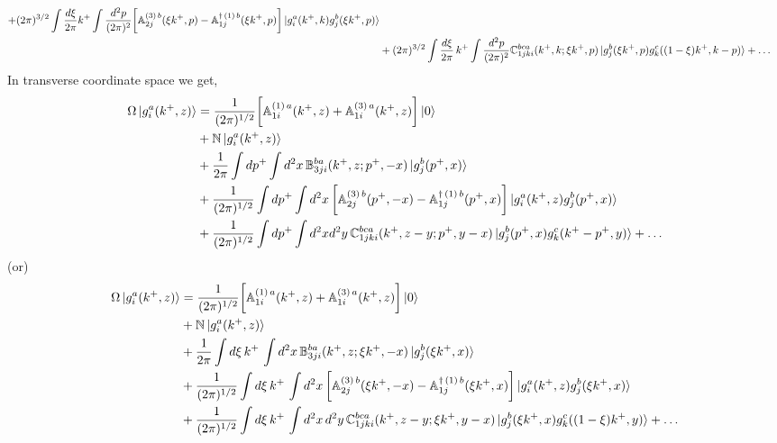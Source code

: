 \documentclass[aps,prd,amsmath,amssymb,nofootinbib]{revtex4-2}
\def\mf#1{\mathbb{#1}}
\numberwithin{equation}{section}
\begin{document}
\begin{itemize}
\begin{align}
    + (2\pi)^{3/2}\int \frac{d\xi}{2\pi} k^{+}\int \frac{d^2p}{(2\pi)^2}  \bigg[\mf{A}^{(3)\, b}_{2j}(\xi k^{+}, p) - \mf{A}^{\dagger\, (1)\, b}_{1j}(\xi k^{+},p)\bigg]  \ket{g^{a}_{i}(k^{+},k)g^{b}_{j}(\xi k^{+},p)} \notag \\ & 
    + (2\pi)^{3/2}\int \frac{d\xi}{2\pi}\, k^{+} \int \frac{d^{2}p}{(2\pi)^{2}}\mf{C}^{bca}_{1jki}(k^{+}, k; \xi k^{+}, p)\ket{g^{b}_{j}(\xi k^{+}, p)g^{c}_{k}((1-\xi)k^{+}, k-p)} %
    + \ldots 
\end{align}
In transverse coordinate space we get,
\begin{align}\label{Omegaongpos}
    \Omega\ket{g^{a}_{i}(k^{+},z)} & = \frac{1}{(2\pi)^{1/2}} \bigg[\mf{A}^{(1)\, a}_{1i}(k^{+},z)+\mf{A}^{(3)\, a}_{1i}(k^{+},z)\bigg]\ket{0} \notag \\ & 
   + 
   \mf{N}\ket{g^{a}_{i}(k^{+},z )} \notag \\ & 
    + \frac{1}{2\pi}\int  dp^{+}  \int d^2x \,\mf{B}^{ba}_{3ji}(k^+, z;p^+, -x)\ket{g^{b}_{j}(p^+, x)} \notag \\ & 
   + \frac{1}{(2\pi)^{1/2}}\int dp^{+}  \int d^{2}x\,\bigg[\mf{A}^{(3)\, b}_{2j}(p^{+},-x) - \mf{A}^{\dagger\, (1)\, b}_{1j}(p^{+},x)\bigg]  \ket{g^{a}_{i}(k^{+}, z)g^{b}_{j}(p^{+}, x)} \notag \\ & 
    + \frac{1}{(2\pi)^{1/2}}\int dp^{+} \int d^{2}x d^{2}y\, \mf{C}^{bca}_{1jki}(k^{+}, z-y; p^{+}, y-x) \ket{g^{b}_{j}(p^{+}, x)g^{c}_{k}(k^{+}-p^{+}, y)}  + \ldots 
\end{align}
(or)
\begin{align}\label{Omegaongposzeta}
    \Omega\ket{g^{a}_{i}(k^{+},z)} & = 
    \frac{1}{(2\pi)^{1/2}} \bigg[\mf{A}^{(1)\, a}_{1i}(k^{+},z)+\mf{A}^{(3)\, a}_{1i}(k^{+},z)\bigg]\ket{0} \notag \\ & + 
    \mf{N}\ket{g^{a}_{i}(k^{+},z )} \notag \\ & 
    + \frac{1}{2\pi}\int  d\xi \, k^{+}\, \int d^2x \,\mf{B}^{ba}_{3ji}(k^+, z;\xi k^+, -x)\ket{g^{b}_{j}(\xi k^+, x)} \notag \\ & 
    + \frac{1}{(2\pi)^{1/2}}\int d\xi\, k^{+}\, \int d^{2}x\, \bigg[\mf{A}^{(3)\, b}_{2j}(\xi k^{+},-x) - \mf{A}^{\dagger\, (1)\, b}_{1j}(\xi k^{+},x)\bigg]  \ket{g^{a}_{i}(k^{+}, z)g^{b}_{j}(\xi k^{+}, x)} \notag \\ & 
    + \frac{1}{(2\pi)^{1/2}}\int d\xi \, k^{+}\, \int d^{2}x\, d^{2}y\, \mf{C}^{bca}_{1jki}(k^{+}, z-y; \xi k^{+}, y-x) \ket{g^{b}_{j}(\xi k^{+}, x)g^{c}_{k}((1-\xi)k^{+}, y)}   + \ldots  
\end{align}
\end{itemize}
\end{document}
